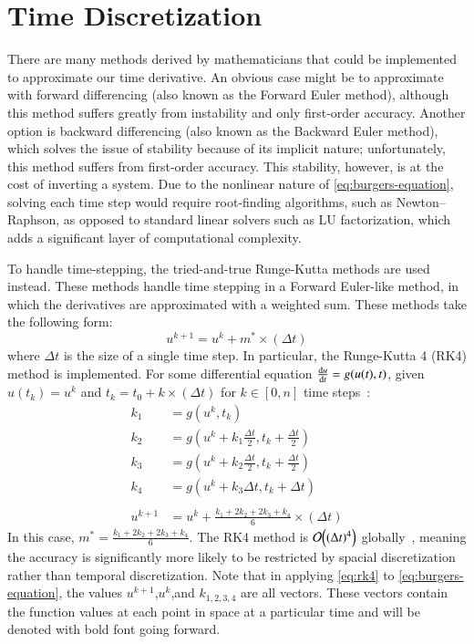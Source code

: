 \documentclass[ltr]{ornltm} %
\numberwithin{equation}{section}
\begin{document}
	\section{Time Discretization} \label{sec:time-discretization}
	There are many methods derived by mathematicians that could be implemented to approximate our time derivative.
	An obvious case might be to approximate with forward differencing (also known as the Forward Euler method), although this method suffers greatly from instability and only first-order accuracy.
	Another option is backward differencing (also known as the Backward Euler method), which solves the issue of stability because of its implicit nature; unfortunately, this method suffers from first-order accuracy.
	This stability, however, is at the cost of inverting a system.
	Due to the nonlinear nature of \cref{eq:burgers-equation}, solving each time step would require root-finding algorithms, such as Newton--Raphson, as opposed to standard linear solvers such as LU factorization, which adds a significant layer of computational complexity.

	To handle time-stepping, the tried-and-true Runge-Kutta methods are used instead.
	These methods handle time stepping in a Forward Euler-like method, in which the derivatives are approximated with a weighted sum.
	These methods take the following form:
	\begin{equation}
		\label{eq:general-rk-method}
		u^{k+1}=u^k+m^* \times (\Delta t)
	\end{equation}
	where $\Delta t$ is the size of a single time step.
	In particular, the Runge-Kutta 4 (RK4) method is implemented.
	For some differential equation $\dv{u}{t}=g(u(t),t)$, given $u(t_k)=u^k$ and $t_k=t_0+k\times(\Delta t)$ for $k\in[0,n]$ time steps~\autocite{FourthOrderRungeKutta}:
	\begin{equation}
		\label{eq:rk4}
		\begin{split}
			k_1&=g\left( u^k,t_k \right)\\
			k_2&=g\left( u^k+k_1\frac{\Delta t}{2},t_k+\frac{\Delta t}{2} \right)\\
			k_3&=g\left( u^k+k_2\frac{\Delta t}{2},t_k+\frac{\Delta t}{2} \right)\\
			k_4 &= g\left( u^k+k_3 \Delta t,t_k+\Delta t \right)\\ \\
			u^{k+1}&=u^k+\frac{k_1+2k_2+2k_3+k_4}{6}\times(\Delta t)
		\end{split}
	\end{equation}
	In this case, $m^* = \frac{k_1+2k_2+2k_3+k_4}{6}$.
	The RK4 method is $\order{(\Delta t)^4}$ globally~\autocite{FourthOrderRungeKutta}, meaning the accuracy is significantly more likely to be restricted by spacial discretization rather than temporal discretization.
	Note that in applying \cref{eq:rk4} to \cref{eq:burgers-equation}, the values $u^{k+1}$,$u^k$,and $k_{1,2,3,4}$ are all vectors.
	These vectors contain the function values at each point in space at a particular time and will be denoted with bold font going forward.
\end{document}
